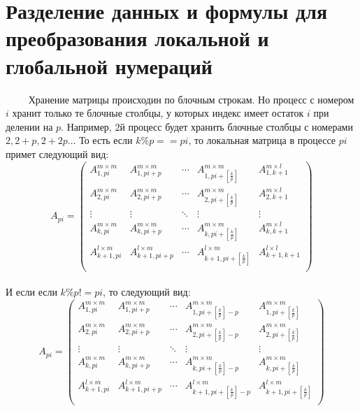 \documentclass[a4paper,12pt]{article}
\begin{document}
\section{Разделение данных и формулы для преобразования локальной и глобальной нумераций} 
$\quad \quad$ Хранение матрицы происходин по блочным строкам. Но процесс с номером $i$  хранит только те блочные столбцы, у которых индекс имеет остаток $i$ при делении на $p$. Например, $2$й процесс будет хранить блочные столбцы с номерами $2, 2 + p, 2 + 2p \dots$
\newpage
То есть если $k \% p == pi$, то локальная матрица в процессе $pi$ примет следующий вид: \\
\begin{equation}
    A_{pi} =
    \begin{pmatrix}
        A_{1,pi}^{m\times m} & A_{1,pi+p}^{m\times m} & \cdots & A_{1,pi+[\frac{k}{p}]}^{m\times m} & A_{1,k + 1}^{m\times l} \\
        A_{2,pi}^{m\times m} & A_{2,pi+p}^{m\times m} & \cdots & A_{2,pi+[\frac{k}{p}]}^{m\times m} & A_{2,k + 1}^{m\times l} \\
        \vdots & \vdots & \ddots & \vdots & \vdots \\
        A_{k,pi}^{m\times m} & A_{k,pi+p}^{m\times m} & \cdots & A_{k,pi+[\frac{k}{p}]}^{m\times m} & A_{k,k + 1}^{m\times l} \\
        A_{k+1,pi}^{l\times m} & A_{k+1,pi+p}^{l\times m} & \cdots & A_{k+1,pi+[\frac{k}{p}]}^{l\times m} & A_{k+1,k + 1}^{l\times l} \\
    \end{pmatrix}
\end{equation} \\

И если если $k \% p != pi$, то следующий вид: \\

\begin{equation}
    A_{pi} =
    \begin{pmatrix}
        A_{1,pi}^{m\times m} & A_{1,pi+p}^{m\times m} & \cdots & A_{1,pi+[\frac{k}{p}] - p}^{m\times m} & A_{1,pi+[\frac{k}{p}]}^{m\times m} \\
        A_{2,pi}^{m\times m} & A_{2,pi+p}^{m\times m} & \cdots & A_{2,pi+[\frac{k}{p}] - p}^{m\times m} & A_{2,pi+[\frac{k}{p}]}^{m\times m} \\
        \vdots & \vdots & \ddots & \vdots & \vdots \\
        A_{k,pi}^{m\times m} & A_{k,pi+p}^{m\times m} & \cdots & A_{k,pi+[\frac{k}{p}] - p}^{m\times m} & A_{k,pi+[\frac{k}{p}]}^{m\times m} \\
        A_{k+1,pi}^{l\times m} & A_{k+1,pi+p}^{l\times m} & \cdots & A_{k+1,pi+[\frac{k}{p}] - p}^{l\times m} & A_{k+1,pi+[\frac{k}{p}]}^{l\times m} \\
    \end{pmatrix}
\end{equation} \\
\end{document}

